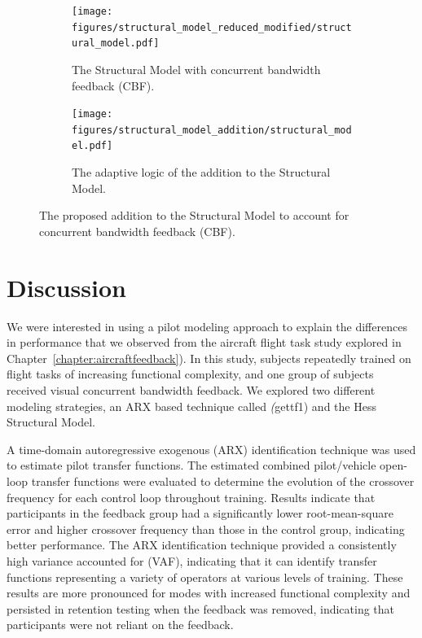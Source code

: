 \begin{figure}[tbp]
    \centering
    \begin{subfigure}{\textwidth}
        \centering
        \texttt{[image: figures/structural\_model\_reduced\_modified/structural\_model.pdf]}
        \caption[The Structural Model with concurrent bandwidth feedback]{The Structural Model with concurrent bandwidth feedback (CBF).}
        \label{fig:structuralmodel_feedback}
    \end{subfigure}
    \hfill
    \begin{subfigure}{\textwidth}
        \centering
        \texttt{[image: figures/structural\_model\_addition/structural\_model.pdf]}
        \caption[The adaptive logic of the addition to the Structural Model]{The adaptive logic of the addition to the Structural Model.}
        \label{fig:structuralmodel_feedbackblock}
    \end{subfigure}
    \caption[The proposed addition to the Structural Model to account for concurrent bandwidth feedback]{The proposed addition to the Structural Model to account for concurrent bandwidth feedback (CBF).}
\end{figure}

\section{Discussion}
We were interested in using a pilot modeling approach to explain the differences in performance that we observed from the aircraft flight task study explored in Chapter~\ref{chapter:aircraftfeedback}).
In this study, subjects repeatedly trained on flight tasks of increasing functional complexity, and one group of subjects received visual concurrent bandwidth feedback.
We explored two different modeling strategies, an ARX based technique called \textit(gettf1) and the Hess Structural Model.

A time-domain autoregressive exogenous (ARX) identification technique was used to estimate pilot transfer functions.
The estimated combined pilot/vehicle open-loop transfer functions were evaluated to determine the evolution of the crossover frequency for each control loop throughout training.
Results indicate that participants in the feedback group had a significantly lower root-mean-square error and higher crossover frequency than those in the control group, indicating better performance.
The ARX identification technique provided a consistently high variance accounted for (VAF), indicating that it can identify transfer functions representing a variety of operators at various levels of training.
These results are more pronounced for modes with increased functional complexity and persisted in retention testing when the feedback was removed, indicating that participants were not reliant on the feedback.

